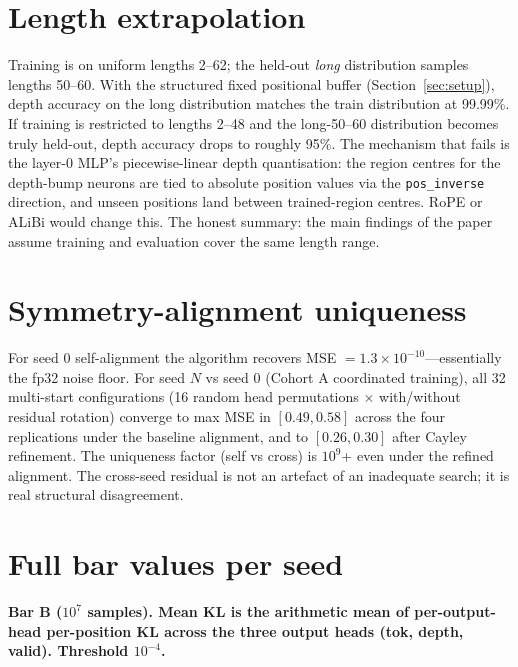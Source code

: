 \documentclass[11pt,letterpaper]{article}
\begin{document}


\appendix

\section{Length extrapolation}
\label{app:length}

Training is on uniform lengths 2--62; the held-out \emph{long} distribution samples lengths 50--60. With the structured fixed positional buffer (Section~\ref{sec:setup}), depth accuracy on the long distribution matches the train distribution at 99.99\%. If training is restricted to lengths 2--48 and the long-50--60 distribution becomes truly held-out, depth accuracy drops to roughly 95\%. The mechanism that fails is the layer-0 MLP's piecewise-linear depth quantisation: the region centres for the depth-bump neurons are tied to absolute position values via the \texttt{pos\_inverse} direction, and unseen positions land between trained-region centres. RoPE \citep{su2021roformer} or ALiBi \citep{press2022alibi} would change this. The honest summary: the main findings of the paper assume training and evaluation cover the same length range.

\section{Symmetry-alignment uniqueness}
\label{app:uniqueness}

For seed 0 self-alignment the algorithm recovers MSE $= 1.3 \times 10^{-10}$---essentially the fp32 noise floor. For seed $N$ vs seed 0 (Cohort A coordinated training), all 32 multi-start configurations (16 random head permutations $\times$ with/without residual rotation) converge to max MSE in $[0.49, 0.58]$ across the four replications under the baseline alignment, and to $[0.26, 0.30]$ after Cayley refinement. The uniqueness factor (self vs cross) is $10^9$+ even under the refined alignment. The cross-seed residual is not an artefact of an inadequate search; it is real structural disagreement.

\section{Full bar values per seed}
\label{app:bars}

\textbf{Bar B ($10^7$ samples). Mean KL is the arithmetic mean of per-output-head per-position KL across the three output heads (tok, depth, valid). Threshold $10^{-4}$.}
\end{document}
